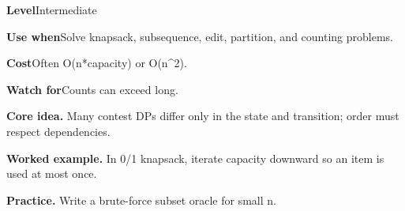 \documentclass[10pt,letterpaper]{article}
\newcommand{\entrylabel}[1]{\textcolor{accent}{\bfseries #1}}
\begin{document}
\begin{guidebox}\small
\entrylabel{Level}\quad Intermediate\par
\entrylabel{Use when}\quad Solve knapsack, subsequence, edit, partition, and counting problems.\par
\entrylabel{Cost}\quad Often O(n*capacity) or O(n\textasciicircum{}2).\par
\entrylabel{Watch for}\quad Counts can exceed long.\par
\end{guidebox}
\noindent\textbf{Core idea.} Many contest DPs differ only in the state and transition; order must respect dependencies.\par
\noindent\textbf{Worked example.} In 0/1 knapsack, iterate capacity downward so an item is used at most once.\par
\noindent\textbf{Practice.} Write a brute-force subset oracle for small n.\par
\end{document}

